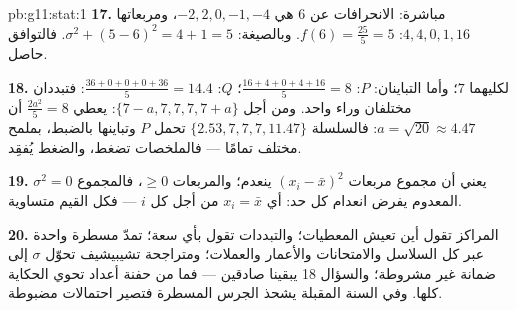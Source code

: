 \begin{solution}{pb:g11:stat:1}
\textbf{17.} مباشرة: الانحرافات عن $6$ هي
$-2, 2, 0, -1, -4$، ومربعاتها $4, 4, 0, 1, 16$:
$f(6) = \frac{25}{5} = 5$. وبالصيغة:
$\sigma^2 + (5 - 6)^2 = 4 + 1 = 5$. فالتوافق حاصل.

\textbf{18.} لكليهما  $7$؛ وأما التباينان:
$P$: $\frac{16 + 4 + 0 + 4 + 16}{5} = 8$؛
$Q$: $\frac{36 + 0 + 0 + 0 + 36}{5} = 14.4$: فتبددان مختلفان
وراء  واحد. ومن أجل $\{7 - a, 7, 7, 7, 7 + a\}$: يعطي 
$\frac{2a^2}{5} = 8$ أن $a = \sqrt{20} \approx 4.47$: فالسلسلة
$\{2.53, 7, 7, 7, 11.47\}$ تحمل  $P$ وتباينها
بالضبط، بملمح مختلف تمامًا ---
فالملخصات تضغط، والضغط يُفقِد.

\textbf{19.} $\sigma^2 = 0$ يعني أن مجموع مربعات
$(x_i - \bar x)^2$ ينعدم؛ والمربعات $\geq 0$، فالمجموع المعدوم
يفرض انعدام كل حد: أي $x_i = \bar x$ من أجل كل $i$
--- فكل القيم متساوية.

\textbf{20.} المراكز تقول أين تعيش المعطيات؛ والتبددات تقول بأي
سعة؛  تمدّ مسطرة واحدة عبر كل السلاسل
والامتحانات والأعمار والعملات؛ ومتراجحة تشيبيشيف تحوّل $\sigma$ إلى
ضمانة غير مشروطة؛ والسؤال 18 يبقينا صادقين
--- فما من حفنة أعداد تحوي الحكاية كلها. وفي السنة
المقبلة يشحذ  الجرس المسطرة فتصير احتمالات
مضبوطة.
\end{solution}
